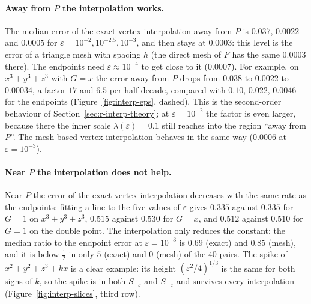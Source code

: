 \documentclass[12pt, a4paper]{article}
\theoremstyle{plain}
\theoremstyle{definition}
\theoremstyle{remark}
\theoremstyle{definition}
\begin{document}
\paragraph{Away from $P$ the interpolation works.} The median error of the exact
vertex interpolation away from $P$ is $0.037$, $0.0022$ and $0.0005$ for
$\varepsilon=10^{-2},10^{-2.5},10^{-3}$, and then stays at $0.0003$: this level is
the error of a triangle mesh with spacing $h$ (the direct mesh of $F$ has the same
$0.0003$ there). The endpoints need $\varepsilon\approx10^{-4}$ to get close to it
($0.0007$). For example, on $x^3+y^3+z^3$ with $G=x$ the error away from $P$ drops
from $0.038$ to $0.0022$ to $0.00034$, a factor $17$ and $6.5$ per half decade,
compared with $0.10$, $0.022$, $0.0046$ for the endpoints
(Figure~\ref{fig:interp-eps}, dashed). This is the second-order behaviour of
Section~\ref{sec:r-interp-theory}; at $\varepsilon=10^{-2}$ the factor is even larger,
because there the inner scale $\lambda(\varepsilon)=0.1$ still reaches into the
region ``away from $P$''. The mesh-based vertex interpolation behaves in the same
way ($0.0006$ at $\varepsilon=10^{-3}$).

\paragraph{Near $P$ the interpolation does not help.} Near $P$ the error of the
exact vertex interpolation decreases with the same rate as the endpoints: fitting a
line to the five values of $\varepsilon$ gives $0.335$ against $0.335$ for $G=1$ on
$x^3+y^3+z^3$, $0.515$ against $0.530$ for $G=x$, and $0.512$ against $0.510$ for
$G=1$ on the double point. The interpolation only reduces the constant: the median
ratio to the endpoint error at $\varepsilon=10^{-3}$ is $0.69$ (exact) and $0.85$
(mesh), and it is below $\tfrac12$ in only $5$ (exact) and $0$ (mesh) of the $40$
pairs. The spike of $x^2+y^2+z^3+kx$ is a clear example: its height
$(\varepsilon^2/4)^{1/3}$ is the same for both signs of $k$, so the spike is in
both $S_{-\varepsilon}$ and $S_{+\varepsilon}$ and survives every interpolation
(Figure~\ref{fig:interp-slices}, third row).
\end{document}
